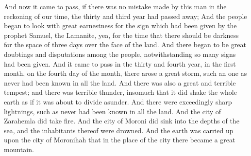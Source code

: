 \bverse \iffalse And now it came to pass, if there was no mistake made by this man in the reckoning of our time, the thirty and third year had passed away; \fi
And now it came to pass, if there was no mistake made by this man in the reckoning of our time, the thirty and third year had passed away;
\bverse \iffalse And the people began to look with great earnestness for the sign which had been given by the prophet Samuel, the Lamanite, yea, for the time that there should be darkness for the space of three days over the face of the land. \fi
And the people began to look with great earnestness for the sign which had been given by the prophet Samuel, the Lamanite, yea, for the time that there should be darkness for the space of three days over the face of the land.
\bverse \iffalse And there began to be great doubtings and disputations among the people, notwithstanding so many signs had been given. \fi
And there began to be great doubtings and disputations among the people, notwithstanding so many signs had been given.
\bverse \iffalse And it came to pass in the thirty and fourth year, in the first month, on the fourth day of the month, there arose a great storm, such an one as never had been known in all the land. \fi
And it came to pass in the thirty and fourth year, in the first month, on the fourth day of the month, there arose a great storm, such an one as never had been known in all the land.
\bverse \iffalse And there was also a great and terrible tempest; and there was terrible thunder, insomuch that it did shake the whole earth as if it was about to divide asunder. \fi
And there was also a great and terrible tempest; and there was terrible thunder, insomuch that it did shake the whole earth as if it was about to divide asunder.
\bverse \iffalse And there were exceedingly sharp lightnings, such as never had been known in all the land. \fi
And there were exceedingly sharp lightnings, such as never had been known in all the land.
\bverse \iffalse And the city of Zarahemla did take fire. \fi
And the city of Zarahemla did take fire.
\bverse \iffalse And the city of Moroni did sink into the depths of the sea, and the inhabitants thereof were drowned. \fi
And the city of Moroni did sink into the depths of the sea, and the inhabitants thereof were drowned.
\bverse \iffalse And the earth was carried up upon the city of Moronihah that in the place of the city there became a great mountain. \fi
And the earth was carried up upon the city of Moronihah that in the place of the city there became a great mountain.
